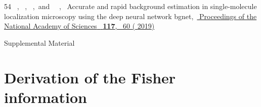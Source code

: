 \documentclass[aps,pra,10pt,showpacs,amsmath,amssymb,floatfix,superscriptaddress,twocolumn]{revtex4-2}
\begin{document}
\begin{thebibliography}{54}
    \BibitemOpen
     { {~},  {\ },  {\ },\ and\  {\ },\ } { {Accurate and rapid background estimation in single-molecule localization microscopy using the deep neural network bgnet},\ }\href {https://doi.org/10.1073/pnas.1916219117} { { {Proceedings of the National Academy of Sciences}\ }\textbf { {117}},\  {60} ( {2019})}%
  \end{thebibliography}%
\endgroup

\onecolumngrid
\newpage


\setcounter{equation}{0}
\setcounter{figure}{0}
\setcounter{table}{0}
\setcounter{page}{1}
\makeatletter
\renewcommand{\theequation}{S\arabic{equation}}
\renewcommand{\thefigure}{S\arabic{figure}}
\renewcommand{\thetable}{S\arabic{table}}



\begin{center}
    \huge\parskip\z@skip
    Supplemental Material
\end{center}

\tableofcontents


\section{Derivation of the Fisher information}
\end{document}
